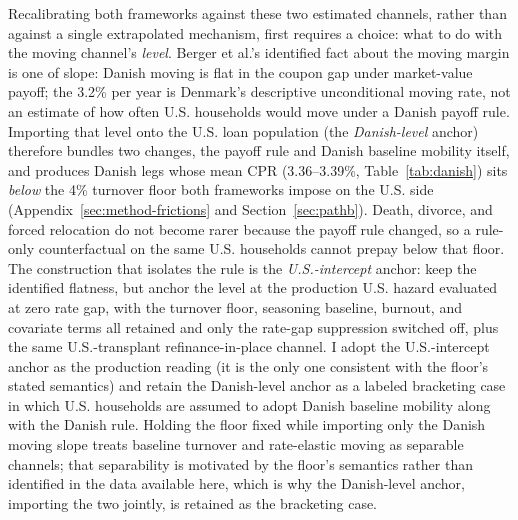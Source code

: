 \documentclass[12pt]{article}
\begin{document}
Recalibrating both frameworks against these two estimated channels, rather than against a single extrapolated mechanism, first requires a choice: what to do with the moving channel's \emph{level}. Berger et al.'s identified fact about the moving margin is one of slope: Danish moving is flat in the coupon gap under market-value payoff; the 3.2\% per year is Denmark's descriptive unconditional moving rate, not an estimate of how often U.S. households would move under a Danish payoff rule. Importing that level onto the U.S. loan population (the \emph{Danish-level} anchor) therefore bundles two changes, the payoff rule and Danish baseline mobility itself, and produces Danish legs whose mean CPR (3.36--3.39\%, Table~\ref{tab:danish}) sits \emph{below} the 4\% turnover floor both frameworks impose on the U.S. side (Appendix~\ref{sec:method-frictions} and Section~\ref{sec:pathb}). Death, divorce, and forced relocation do not become rarer because the payoff rule changed, so a rule-only counterfactual on the same U.S. households cannot prepay below that floor. The construction that isolates the rule is the \emph{U.S.-intercept} anchor: keep the identified flatness, but anchor the level at the production U.S. hazard evaluated at zero rate gap, with the turnover floor, seasoning baseline, burnout, and covariate terms all retained and only the rate-gap suppression switched off, plus the same U.S.-transplant refinance-in-place channel. I adopt the U.S.-intercept anchor as the production reading (it is the only one consistent with the floor's stated semantics) and retain the Danish-level anchor as a labeled bracketing case in which U.S. households are assumed to adopt Danish baseline mobility along with the Danish rule. Holding the floor fixed while importing only the Danish moving slope treats baseline turnover and rate-elastic moving as separable channels; that separability is motivated by the floor's semantics rather than identified in the data available here, which is why the Danish-level anchor, importing the two jointly, is retained as the bracketing case.
\end{document}
